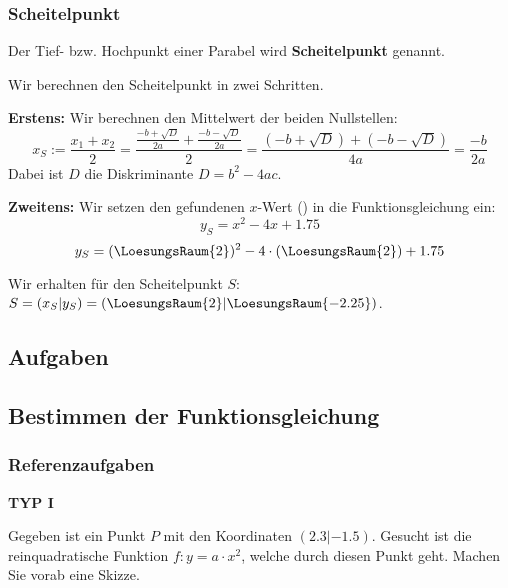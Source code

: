 \subsubsection{Scheitelpunkt}
Der Tief- bzw. Hochpunkt einer Parabel wird \textbf{Scheitelpunkt}
genannt.

Wir berechnen den Scheitelpunkt in zwei Schritten.

\textbf{Erstens:} Wir berechnen den Mittelwert der beiden Nullstellen:
$$x_S := \frac{x_{1} + x_{2}}{2} = \frac{\frac{-b+\sqrt{D}}{2a} + \frac{-b-\sqrt{D}}{2a}}{2} =
\frac{(-b+\sqrt{D}) + (-b-\sqrt{D})}{4a} =\frac{-b}{2a}$$
Dabei ist $D$ die Diskriminante $D=b^2-4ac$.


\textbf{Zweitens:} Wir setzen den gefundenen $x$-Wert
() in die Funktionsgleichung
ein:
$$y_S = x^2 - 4x + 1.75$$
$$y_S = (\LoesungsRaum{2})^2 - 4\cdot{}(\LoesungsRaum{2}) + 1.75$$

Wir erhalten für den Scheitelpunkt $S$: $S=(x_S | y_S) = (\LoesungsRaum{2} | \LoesungsRaum{-2.25})$.

  
\subsection*{Aufgaben}

\newpage

\subsection{Bestimmen der Funktionsgleichung}

\subsubsection{Referenzaufgaben}

\textbf{TYP I}

Gegeben ist ein Punkt $P$ mit den Koordinaten $(2.3 | -1.5)$. Gesucht ist die reinquadratische Funktion $f: y=a\cdot{}x^2$, welche durch diesen Punkt geht.
Machen Sie vorab eine Skizze.



